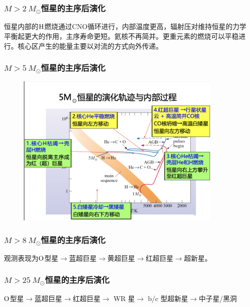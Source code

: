 \documentclass[../天体物理基础.tex]{subfiles}
\begin{document}
\subsubsection{\texorpdfstring{$M>\qty{2}{M_{\odot}}$}{}恒星的主序后演化}

恒星内部的$\ce{H}$燃烧通过$\mathrm{CNO}$循环进行，内部温度更高，辐射压对维持恒星的力学平衡起更大的作用，主序寿命更短。氦核不再简并。更重元素的燃烧可以平稳进行。核心区产生的能量主要以对流的方式向外传递。

\subsubsection{\texorpdfstring{$M>\qty{5}{M_{\odot}}$}{}恒星的主序后演化}

\begin{figure}[!htbp]
\centering
\includegraphics[width=10cm]{figures/figure2_6.png}
\captionsetup{justification=raggedright, singlelinecheck=false}
\caption{}
\label{}
\end{figure}

\subsubsection{\texorpdfstring{$M>\qty{8}{M_{\odot}}$}{}恒星的主序后演化}

观测表现为$\rm O$型星$\to$蓝超巨星$\to$黄超巨星$\to$红超巨星$\to$超新星。

\subsubsection{\texorpdfstring{$M>\qty{25}{M_{\odot}}$}{}恒星的主序后演化}

$\ce{O}$型星$\to$蓝超巨星$\to$红超巨星$\to$ WR 星$\to$ \uppercase\expandafter{}b/\uppercase\expandafter{}c 型超新星$\to$中子星/黑洞
\end{document}
